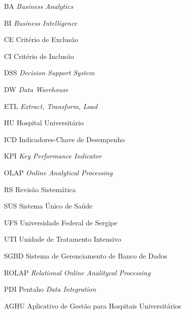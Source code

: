 
\begin{siglas}
	\item[BA]{\textit{Business Analytics}}
    \item[BI]{\textit{Business Intelligence}}
    \item[CE]{Critério de Exclusão}
    \item[CI]{Critério de Inclusão}
    \item[DSS]{\textit{Decision Support System}}
    \item[DW]{\textit{Data Warehouse}}
    \item[ETL]{\textit{Extract, Transform, Load}}
  	\item[HU]{Hospital Universitário}
  	\item[ICD]{Indicadores-Chave de Desempenho}
    \item[KPI]{\textit{Key Performance Indicator}}
    \item[OLAP]{\textit{Online Analytical Processing}}
    \item[RS]{Revisão Sistemática}
    \item[SUS]{Sistema Único de Saúde}
	\item[UFS]{Universidade Federal de Sergipe}
	\item[UTI]{Unidade de Tratamento Intensivo}
	\item[SGBD]{Sistema de Gerenciamento de Banco de Dados}
	\item[ROLAP]{\textit{Relational Online Analitycal Processing}}
	\item[PDI]{Pentaho \textit{Data Integration}}
	\item[AGHU]{Aplicativo de Gestão para Hospitais Universitários}
\end{siglas}